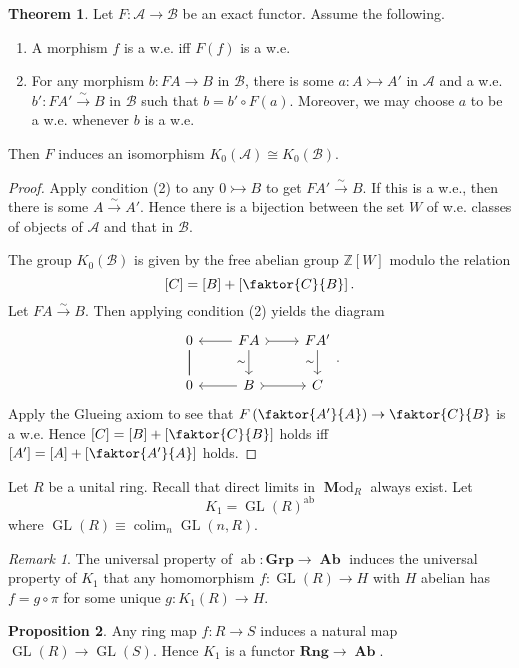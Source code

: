\documentclass[10pt,letterpaper,cm]{nupset}
\theoremstyle{definition}
\theoremstyle{theorem}
\newtheorem{theorem}{Theorem}
\newtheorem{prop}[theorem]{Proposition}
\theoremstyle{remark}
\newtheorem{remark}{Remark}
\newcommand{\Z}{\mathbb Z}
\newcommand{\1}{\mathbf{1}}
\renewcommand{\a}{\mathscr{A}}
\renewcommand{\b}{\mathscr{B}}
\newcommand{\0}{\vec 0}
\DeclareMathOperator*{\GL}{GL}
\DeclareMathOperator{\ab}{ab}
\DeclareMathOperator{\colim}{colim}
\DeclareMathOperator{\Ab}{\mathbf{Ab}}
\DeclareMathOperator{\Mod}{\mathbf Mod}
\begin{document}
\begin{theorem}
Let $F : \a \to \b$ be an exact functor. Assume the following.
\begin{enumerate}[label=(\arabic*)]
\item A morphism $f$ is a w.e. iff $F(f)$ is a w.e.
\item For any morphism $b : FA \to B$ in $\b$, there is some $a: A \rightarrowtail A'$ in $\a$ and a w.e. $b' : FA' \overset{\sim}{\longrightarrow} B$ in $\b$ such that $b = b' \circ F(a)$. Moreover, we may choose $a$ to be a w.e. whenever $b$ is a w.e.
\end{enumerate}
Then $F$ induces an isomorphism $K_0(\a) \cong K_0(\b)$.
\end{theorem}
\begin{proof}
Apply condition (2) to any $0 \rightarrowtail B$ to get $FA' \overset{\sim}{\longrightarrow} B$. If this is a w.e., then there is some $A \overset{\sim}{\longrightarrow} A'$. Hence there is a bijection between the set $W$ of w.e. classes of objects of $\a$ and that in $\b$. 
\medskip

 The group $K_0(\b)$ is given by the free abelian group $\Z[W]$ modulo the relation $$[C] = [B] + \left[\faktor{C}{B}\right].$$ Let $FA \overset{\sim}{\longrightarrow}  B$. Then applying condition (2) yields the diagram
\[
\begin{tikzcd}
0 \arrow[d, no head] \arrow[d, no head] & FA \arrow[d, "\sim"'] \arrow[r, tail] \arrow[l] & FA' \arrow[d, "\sim"'] \\
0 & B \arrow[r, tail] \arrow[l] & C
\end{tikzcd}.
\]
Apply the Glueing axiom to see that $F\left(\faktor{A'}{A}\right) \to \faktor{C}{B}$ is a w.e. Hence $[C] = [B] + \left[\faktor{C}{B}\right]$
 holds iff $[A'] = [A] + \left[\faktor{A'}{A}\right]$ holds.
\end{proof}

\bigskip


Let $R$ be a unital ring. Recall that direct limits in $\Mod_R$ always exist. Let $$K_1 = \GL(R)^{\ab}$$ where $\GL(R) \equiv\colim_n \GL(n, R)$.

\begin{remark}
The universal property of $\ab: \mathbf{Grp} \to \Ab$ induces the universal property of $K_1$ that any homomorphism $f: \GL(R) \to H$ with $H$ abelian has $f = g \circ \pi$ for some unique $g: K_1(R) \to H$.
\end{remark}

\begin{prop}
Any ring map $f: R \to S$ induces a natural map $\GL(R) \to \GL(S)$. Hence $K_1$ is a functor $\mathbf{Rng} \to \Ab$.
\end{prop}
\end{document}
